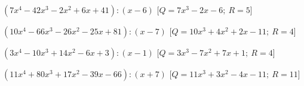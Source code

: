 \begin{esercizio}
\begin{enumeratea}
  \item  $\left(7 x^4 -42 x^3 -2 x^2 +6 x +41 \right) : \left(x -6 \right)$
   \hfill [$Q = 7 x^3 -2 x -6;~R = 5$]
  \item  $\left(10 x^4 -66 x^3 -26 x^2 -25 x +81 \right) : \left(x -7 \right)$
   \hfill [$Q = 10 x^3 +4 x^2 +2 x -11;~R = 4$]
  \item  $\left(3 x^4 -10 x^3 +14 x^2 -6 x +3 \right) : \left(x -1 \right)$
   \hfill [$Q = 3 x^3 -7 x^2 +7 x +1;~R = 4$]
  \item  $\left(11 x^4 +80 x^3 +17 x^2 -39 x -66 \right) : \left(x +7 \right)$
   \hfill [$Q = 11 x^3 +3 x^2 -4 x -11;~R = 11$]
 \end{enumeratea}
\end{esercizio}


